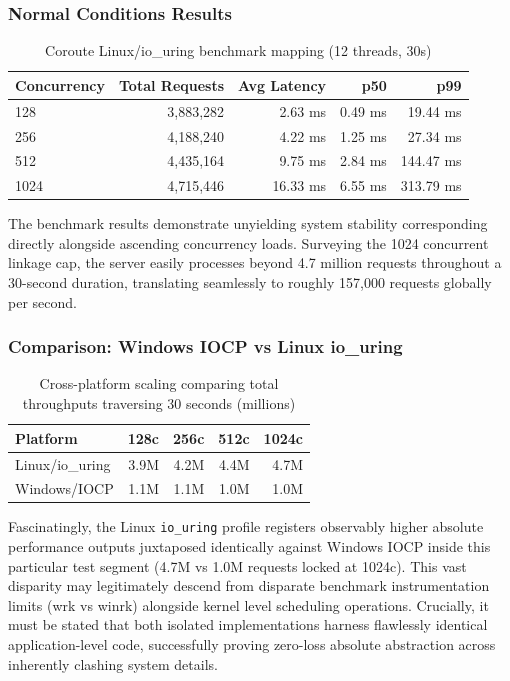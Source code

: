 \subsubsection{Normal Conditions Results}

\begin{table}[H]
\centering
\caption{Coroute Linux/io\_uring benchmark mapping (12 threads, 30s)}
\label{tab:linux_benchmark}
\begin{tabular}{|l|r|r|r|r|}
\hline
\textbf{Concurrency} & \textbf{Total Requests} & \textbf{Avg Latency} & \textbf{p50} & \textbf{p99} \\
\hline
128 & 3,883,282 & 2.63 ms & 0.49 ms & 19.44 ms \\
256 & 4,188,240 & 4.22 ms & 1.25 ms & 27.34 ms \\
512 & 4,435,164 & 9.75 ms & 2.84 ms & 144.47 ms \\
1024 & 4,715,446 & 16.33 ms & 6.55 ms & 313.79 ms \\
\hline
\end{tabular}
\end{table}

The benchmark results demonstrate unyielding system stability corresponding directly alongside ascending concurrency loads. Surveying the 1024 concurrent linkage cap, the server easily processes beyond 4.7 million requests throughout a 30-second duration, translating seamlessly to roughly 157,000 requests globally per second.

\subsubsection{Comparison: Windows IOCP vs Linux io\_uring}

\begin{table}[H]
\centering
\caption{Cross-platform scaling comparing total throughputs traversing 30 seconds (millions)}
\label{tab:platform_comparison}
\begin{tabular}{|l|r|r|r|r|}
\hline
\textbf{Platform} & \textbf{128c} & \textbf{256c} & \textbf{512c} & \textbf{1024c} \\
\hline
Linux/io\_uring & 3.9M & 4.2M & 4.4M & 4.7M \\
Windows/IOCP & 1.1M & 1.1M & 1.0M & 1.0M \\
\hline
\end{tabular}
\end{table}

Fascinatingly, the Linux \texttt{io\_uring} profile registers observably higher absolute performance outputs juxtaposed identically against Windows IOCP inside this particular test segment (4.7M vs 1.0M requests locked at 1024c). This vast disparity may legitimately descend from disparate benchmark instrumentation limits (wrk vs winrk) alongside kernel level scheduling operations. Crucially, it must be stated that both isolated implementations harness flawlessly identical application-level code, successfully proving zero-loss absolute abstraction across inherently clashing system details.

